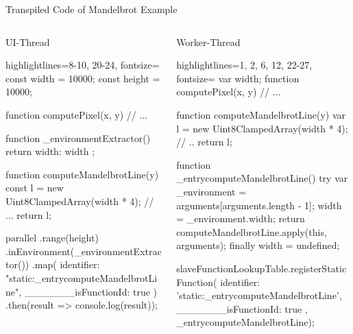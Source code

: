 \begin{frame}{Transpiled Code of Mandelbrot Example}
\begin{columns}[t]
	\begin{column}{0.5\textwidth}
		UI-Thread
		\begin{javascriptcode*}{highlightlines={8-10, 20-24}, fontsize=\tiny}
const width = 10000;
const height = 10000;

function computePixel(x, y) {
	// ...
}

function _environmentExtractor() { 
	return { width: width };
}

function computeMandelbrotLine(y) {
	const l = new Uint8ClampedArray(width * 4);
	// ...
	return l;
}

parallel
	.range(height)
	.inEnvironment(_environmentExtractor()) 
	.map({ 
		identifier: "static:_entrycomputeMandelbrotLine",
		_______isFunctionId: true
	}) 
	.then(result => console.log(result));
\end{javascriptcode*}
	\end{column}
	\begin{column}{0.5\textwidth}
	Worker-Thread
	\begin{javascriptcode*}{highlightlines={1, 2, 6, 12, 22-27}, fontsize=\tiny}
var width;
function computePixel(x, y) { 
	// ...
}

function computeMandelbrotLine(y) { 
	var l = new Uint8ClampedArray(width * 4);
	// ..
	return l;
}
 
function _entrycomputeMandelbrotLine() { 
	try {
		var _environment = arguments[arguments.length - 1];
		width = _environment.width; 
		return computeMandelbrotLine.apply(this, arguments); 
	} finally {
		width = undefined;
	}
} 

slaveFunctionLookupTable.registerStaticFunction({
		identifier: 'static:_entrycomputeMandelbrotLine',
		_______isFunctionId: true
	}, _entrycomputeMandelbrotLine);
\end{javascriptcode*}
	\end{column}
\end{columns}


\end{frame}